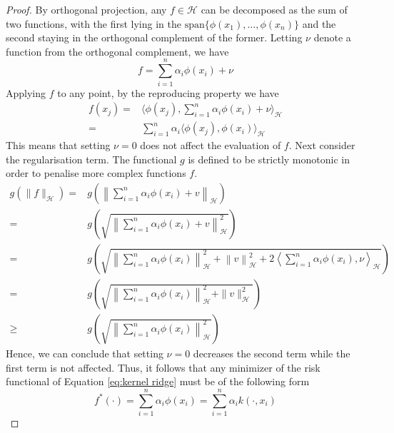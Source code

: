 \begin{proof}
    By orthogonal projection, any $f \in \mathcal{H}$ can be decomposed as the sum of two functions, with the first lying in the $\textrm{span}\{\phi(x_1),\dots, \phi(x_n)\}$ and the second staying in the orthogonal complement of the former. Letting $\nu$ denote a function from the orthogonal complement, we have
    \begin{equation}
        f=\sum\limits_{i=1}^{n}\alpha_i \phi(x_i)+\nu
    \end{equation}
    Applying $f$ to any point, by the reproducing property we have
    \begin{equation}
        \begin{aligned}
            f(x_j)=&\langle \phi(x_j), \sum\limits_{i=1}^{n}\alpha_i \phi(x_i)+\nu\rangle_{\mathcal{H}}
            \\
            =&\sum\limits_{i=1}^{n}\alpha_i\langle \phi(x_j), \phi(x_i)\rangle_{\mathcal{H}}
        \end{aligned}
    \end{equation}
    This means that setting $\nu=0$ does not affect the evaluation of $f$.
    Next consider the regularisation term. The functional $g$ is defined to be strictly monotonic in order to penalise more complex functions $f$.
    \begin{equation}
        \begin{aligned}
            g(\|f\|_{\mathcal{H}})=&g\left(\left\|\sum\limits_{i=1}^n \alpha_i \phi(x_i)+v\right\|_\mathcal{H}\right)
            \\
            =&g\left(\sqrt{\left\|\sum\limits_{i=1}^n \alpha_i \phi(x_i)+v\right\|_\mathcal{H}^2}\right)
            \\
            =&g\left(\sqrt{\left\|\sum\limits_{i=1}^n \alpha_i \phi(x_i)\right\|_{\mathcal{H}}^2+\left\|v\right\|_\mathcal{H}^2+2\left\langle\sum\limits_{i=1}^n \alpha_i \phi(x_i),\nu \right\rangle_{\mathcal{H}}}\right)
            \\
            =&g\left(\sqrt{\left\|\sum\limits_{i=1}^n \alpha_i \phi(x_i)\right\|_{\mathcal{H}}^2+\|v\|_\mathcal{H}^2}\right)
            \\
            \geq &g\left(\sqrt{\left\|\sum\limits_{i=1}^n \alpha_i \phi(x_i)\right\|_{\mathcal{H}}^2}\right)
        \end{aligned}
    \end{equation}
    Hence, we can conclude that setting $\nu=0$ decreases the second term while the first term is not affected. Thus, it follows that any minimizer of the risk functional of Equation \ref{eq:kernel ridge} must be of the following form
    \begin{equation}
        f^*(\cdot)=\sum\limits_{i=1}^n \alpha_i \phi(x_i)=\sum\limits_{i=1}^n \alpha_i k(\cdot, x_i)
    \end{equation}
\end{proof}

